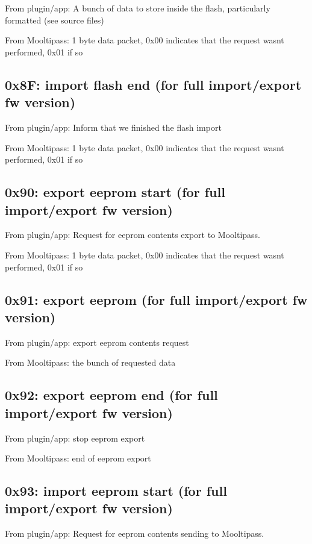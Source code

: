 From plugin/app\+: A bunch of data to store inside the flash, particularly formatted (see source files)

From Mooltipass\+: 1 byte data packet, 0x00 indicates that the request wasn\textquotesingle{}t performed, 0x01 if so

\subsection*{0x8F\+: import flash end (for full import/export fw version) }

From plugin/app\+: Inform that we finished the flash import

From Mooltipass\+: 1 byte data packet, 0x00 indicates that the request wasn\textquotesingle{}t performed, 0x01 if so

\subsection*{0x90\+: export eeprom start (for full import/export fw version) }

From plugin/app\+: Request for eeprom contents export to Mooltipass.

From Mooltipass\+: 1 byte data packet, 0x00 indicates that the request wasn\textquotesingle{}t performed, 0x01 if so

\subsection*{0x91\+: export eeprom (for full import/export fw version) }

From plugin/app\+: export eeprom contents request

From Mooltipass\+: the bunch of requested data

\subsection*{0x92\+: export eeprom end (for full import/export fw version) }

From plugin/app\+: stop eeprom export

From Mooltipass\+: end of eeprom export

\subsection*{0x93\+: import eeprom start (for full import/export fw version) }

From plugin/app\+: Request for eeprom contents sending to Mooltipass.

